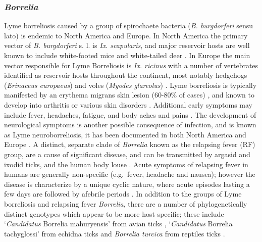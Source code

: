 \documentclass[a4paper, nobind]{templates/ociamthesis}
\begin{document}
\hypertarget{borrelia}{%
\subsubsection{\texorpdfstring{\emph{Borrelia}}{Borrelia}}\label{borrelia}}

Lyme borreliosis caused by a group of spirochaete bacteria (\emph{B. burgdorferi} sensu lato) is endemic to North America and Europe.
In North America the primary vector of \emph{B. burgdorferi} s. l. is \emph{Ix. scapularis}, and major reservoir hosts are well known to include white-footed mice and white-tailed deer \autocite{halseyRoleIxodesScapularis2018}.
In Europe the main vector responsible for Lyme Borreliosis is \emph{Ix. ricinus} \autocite{kirsteinLocalVariationsDistribution1997} with a number of vertebrates identified as reservoir hosts throughout the continent, most notably hedgehogs (\emph{Erinaceus europaeus}) and voles (\emph{Myodes glareolus}) \autocite{jahfariMeltingPotTickborne2017,coipanGeneticDiversityBorrelia2018,estrada-penaHighThroughputSequencing2018}.
Lyme borreliosis is typically manifested by an erythema migrans skin lesion (60-80\% of cases) \autocite{rizzoliLymeBorreliosisEurope2011}, and known to develop into arthritis or various skin disorders \autocite{stanekLymeBorreliosis2012}.
Additional early symptoms may include fever, headaches, fatigue, and body aches and pains \autocite{rizzoliLymeBorreliosisEurope2011,clarkLymeBorreliosisHuman2013}.
The development of neurological symptoms is another possible consequence of infection, and is known as Lyme neuroborreliosis, it has been documented in both North America and Europe \autocite{clarkLymeBorreliosisHuman2013,strleComparisonFindingsPatients2006}.
A distinct, separate clade of \emph{Borrelia} known as the relapsing fever (RF) group, are a cause of significant disease, and can be transmitted by argasid and ixodid ticks, and the human body louse \autocite{lopezTickBorneRelapsingFever2016}.
Acute symptoms of relapsing fever in humans are generally non-specific (e.g.~fever, headache and nausea); however the disease is characterize by a unique cyclic nature, where acute episodes lasting a few days are followed by afebrile periods \autocite{dworkinTickborneRelapsingFever2008}.
In addition to the groups of Lyme borreliosis and relapsing fever \emph{Borrelia}, there are a number of phylogenetically distinct genotypes which appear to be more host specific; these include `\emph{Candidatus} Borrelia mahuryensis' from avian ticks \autocite{munoz-lealCandidatusBorreliaIbitipoquensis2020}, `\emph{Candidatus} Borrelia tachyglossi' from echidna ticks \autocite{lohMolecularCharacterizationCandidatus2017} and \emph{Borrelia turcica} from reptiles ticks \autocite{gunerBorreliaTurcicaSp2004}.
\end{document}
